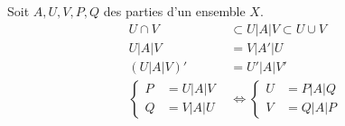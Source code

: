 \begin{propn}\label{Prop:OpTern}
 Soit $A, U, V, P, Q$ des parties d'un ensemble $X$.
 \begin{align}
  U \cap V &\subset U | A | V \subset U \cup V \\
  U | A | V &= V | A' | U \\
  (U | A | V)' &= U' | A | V' \\
  \left\lbrace
  \begin{aligned}
    P &= U | A | V \\
    Q &= V | A | U
  \end{aligned}
  \right.
  &\Leftrightarrow
  \left\lbrace
  \begin{aligned}
    U &= P | A | Q \\
    V &= Q | A | P
  \end{aligned}
  \right.
 \end{align}
\end{propn}
